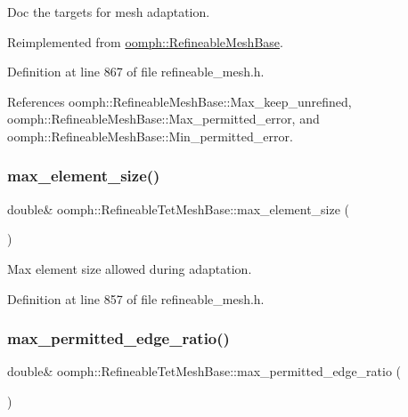 Doc the targets for mesh adaptation. 



Reimplemented from \hyperlink{classoomph_1_1RefineableMeshBase_a9f54bbde6fbfe2fef719c4d3fa5e0ae7}{oomph\+::\+Refineable\+Mesh\+Base}.



Definition at line 867 of file refineable\+\_\+mesh.\+h.



References oomph\+::\+Refineable\+Mesh\+Base\+::\+Max\+\_\+keep\+\_\+unrefined, oomph\+::\+Refineable\+Mesh\+Base\+::\+Max\+\_\+permitted\+\_\+error, and oomph\+::\+Refineable\+Mesh\+Base\+::\+Min\+\_\+permitted\+\_\+error.

\mbox{\label{classoomph_1_1RefineableTetMeshBase_a84198746ef0ce7787a1282d9de223504}} 
\subsubsection{\texorpdfstring{max\+\_\+element\+\_\+size()}{max\_element\_size()}}
{\footnotesize\ttfamily double\& oomph\+::\+Refineable\+Tet\+Mesh\+Base\+::max\+\_\+element\+\_\+size (\begin{DoxyParamCaption}{ }\end{DoxyParamCaption})\hspace{0.3cm}{\ttfamily [inline]}}



Max element size allowed during adaptation. 



Definition at line 857 of file refineable\+\_\+mesh.\+h.

\mbox{\label{classoomph_1_1RefineableTetMeshBase_af62f816ad38f1221f24e5637731ed320}} 
\subsubsection{\texorpdfstring{max\+\_\+permitted\+\_\+edge\+\_\+ratio()}{max\_permitted\_edge\_ratio()}}
{\footnotesize\ttfamily double\& oomph\+::\+Refineable\+Tet\+Mesh\+Base\+::max\+\_\+permitted\+\_\+edge\+\_\+ratio (\begin{DoxyParamCaption}{ }\end{DoxyParamCaption})\hspace{0.3cm}{\ttfamily [inline]}}



